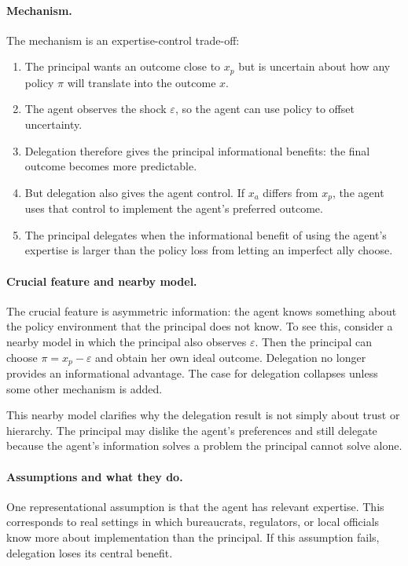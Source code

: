 \documentclass[12pt]{article}
\begin{document}
\paragraph{Mechanism.}
The mechanism is an expertise-control trade-off:
\begin{enumerate}
\item The principal wants an outcome close to $x_p$ but is uncertain about how any policy $\pi$ will translate into the outcome $x$.
\item The agent observes the shock $\varepsilon$, so the agent can use policy to offset uncertainty.
\item Delegation therefore gives the principal informational benefits: the final outcome becomes more predictable.
\item But delegation also gives the agent control. If $x_a$ differs from $x_p$, the agent uses that control to implement the agent's preferred outcome.
\item The principal delegates when the informational benefit of using the agent's expertise is larger than the policy loss from letting an imperfect ally choose.
\end{enumerate}

\paragraph{Crucial feature and nearby model.}
The crucial feature is asymmetric information: the agent knows something about the policy environment that the principal does not know. To see this, consider a nearby model in which the principal also observes $\varepsilon$. Then the principal can choose $\pi=x_p-\varepsilon$ and obtain her own ideal outcome. Delegation no longer provides an informational advantage. The case for delegation collapses unless some other mechanism is added.

This nearby model clarifies why the delegation result is not simply about trust or hierarchy. The principal may dislike the agent's preferences and still delegate because the agent's information solves a problem the principal cannot solve alone.

\paragraph{Assumptions and what they do.}
One representational assumption is that the agent has relevant expertise. This corresponds to real settings in which bureaucrats, regulators, or local officials know more about implementation than the principal. If this assumption fails, delegation loses its central benefit.
\end{document}
